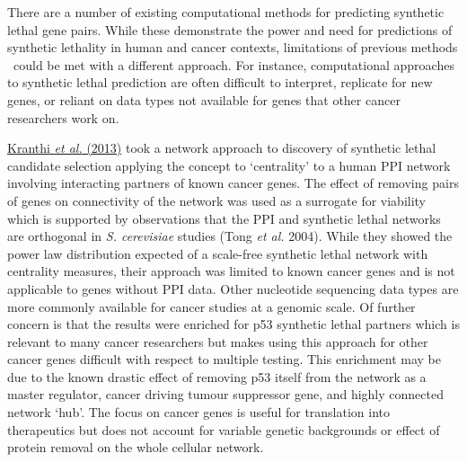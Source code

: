 There are a number of existing computational methods for predicting
synthetic lethal gene pairs. While these demonstrate the power and
need for predictions of synthetic lethality in human and cancer
contexts, limitations of previous methods \ could be met with a
different approach. For instance, computational approaches to
synthetic lethal prediction are often difficult to interpret, replicate
for new genes, or reliant on data types not available for genes that
other cancer researchers work on. 


\hyperlink{ENREF59}{Kranthi}\hyperlink{ENREF59}{\textit{ et
al.}}\hyperlink{ENREF59}{ (2013)} took a network approach to discovery
of synthetic lethal candidate selection applying the concept to
{\textquoteleft}centrality{\textquoteright} to a human PPI network
involving interacting partners of known cancer genes. The effect of
removing pairs of genes on connectivity of the network was used as a
surrogate for viability which is supported by observations that the PPI
and synthetic lethal networks are orthogonal in \textit{S. cerevisiae}
studies (Tong\textit{ et al.} 2004). While they showed the power law
distribution expected of a scale-free synthetic lethal network with
centrality measures, their approach was limited to known cancer genes
and is not applicable to genes without PPI data. Other nucleotide
sequencing data types are more commonly available for cancer studies at
a genomic scale. Of further concern is that the results were enriched
for p53 synthetic lethal partners which is relevant to many cancer
researchers but makes using this approach for other cancer genes
difficult with respect to multiple testing. This enrichment may be
due to the known drastic effect of removing p53 itself from the network
as a master regulator, cancer driving tumour suppressor gene, and
highly connected network {\textquoteleft}hub{\textquoteright}. The
focus on cancer genes is useful for translation into therapeutics but
does not account for variable genetic backgrounds or effect of protein
removal on the whole cellular network. 


